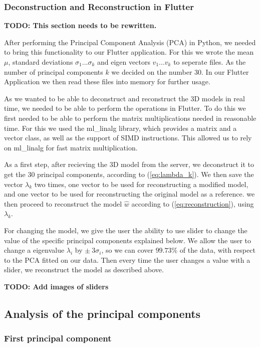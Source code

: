 \subsubsection{Deconstruction and Reconstruction in Flutter}
\textbf{TODO: This section needs to be rewritten.}

After performing the Principal Component Analysis (PCA) in Python, we needed to bring this functionality to our Flutter application. For this we wrote the mean $\mu$, standard deviations
$\sigma_1...\sigma_k$ and eigen vectors $v_1...v_k$ to seperate files. As the number of principal components $k$ we decided on the number 30. In our Flutter Application we then read these files
into memory for further usage. 

As we wanted to be able to deconstruct and reconstruct the 3D models in real time, we needed to be able to perform the operations in Flutter. To do this we first needed to be able to perform 
the matrix multiplications needed in reasonable time. For this we used the ml\_linalg library, which provides a matrix and a vector class, as well as the support of SIMD instructions. This allowed us to rely on 
ml\_linalg for fast matrix multiplication. 

As a first step, after recieving the 3D model from the server, we deconstruct it to get the 30 principal components, according to (\ref{eq:lambda_k}). We then save the vector $\lambda_k$ two times,
one vector to be used for reconstructing a modified model, and one vector to be used for reconstructing the original model as a reference. we then proceed to reconstruct the model
$\hat{w}$ according to (\ref{eq:reconstruction}), using $\lambda_k$.

For changing the model, we give the user the ability to use slider to change the value of the specific principal components explained below. We allow the user to change a eigenvalue $\lambda_i$ 
by $\pm\ 3\sigma_i$, so we can cover $99.73\%$ of the data, with respect to the PCA fitted on our data. Then every time the user changes a value with a slider, we reconstruct the
model as described above.

\textbf{TODO: Add images of sliders}

\subsection{Analysis of the principal components}

\subsubsection{First principal component}

